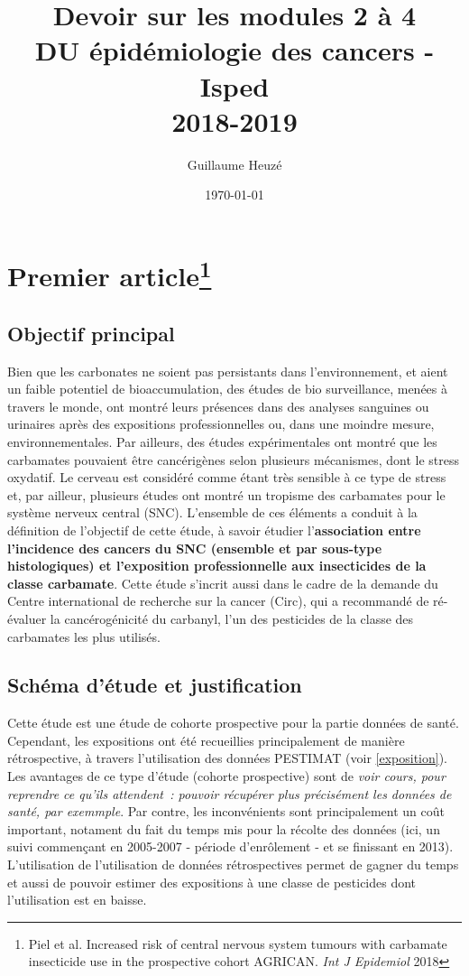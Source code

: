 \documentclass[10pt]{article}
\begin{document}
\title{Devoir sur les modules 2 à 4\\
\small{DU épidémiologie des cancers - Isped\\
2018-2019}}
\author{Guillaume Heuzé}
\date{\today}
\maketitle

\section{Premier article\protect\footnote{Piel et al. Increased risk of central nervous system tumours with carbamate insecticide use in the prospective cohort AGRICAN. \emph{Int J Epidemiol} 2018}}
\subsection{Objectif principal}
Bien que les carbonates ne soient pas persistants dans l'environnement, et aient un faible potentiel de bioaccumulation, des études de bio surveillance, menées à travers le monde, ont montré leurs présences dans des analyses sanguines ou urinaires après des expositions professionnelles ou, dans une moindre mesure, environnementales. Par ailleurs, des études expérimentales ont montré que les carbamates pouvaient être cancérigènes selon plusieurs mécanismes, dont le stress oxydatif. Le cerveau est considéré comme étant très sensible à ce type de stress et, par ailleur, plusieurs études ont montré un tropisme des carbamates pour le système nerveux central (SNC). L'ensemble de ces éléments a conduit à la définition de l'objectif de cette étude, à savoir étudier l'\textbf{association entre l'incidence des cancers du SNC (ensemble et par sous-type histologiques) et l'exposition professionnelle aux insecticides de la classe carbamate}. Cette étude s'incrit aussi dans le cadre de la demande du Centre international de recherche sur la cancer (Circ), qui a recommandé de ré-évaluer la cancérogénicité du carbanyl, l'un des pesticides de la classe des carbamates les plus utilisés.

\subsection{Schéma d'étude et justification}
Cette étude est une étude de cohorte prospective pour la partie données de santé. Cependant, les expositions ont été recueillies principalement de manière rétrospective, à travers l'utilisation des données PESTIMAT (voir \ref{exposition}). Les avantages de ce type d'étude (cohorte prospective) sont de \emph{voir cours, pour reprendre ce qu'ils attendent~: pouvoir récupérer plus précisément les données de santé, par exemmple}. Par contre, les inconvénients sont principalement un coût important, notament du fait du temps mis pour la récolte des données (ici, un suivi commençant en 2005-2007 - période d'enrôlement - et se finissant en 2013). L'utilisation de l'utilisation de données rétrospectives permet de gagner du temps et aussi de pouvoir estimer des expositions à une classe de pesticides dont l'utilisation est en baisse. 
\end{document}
